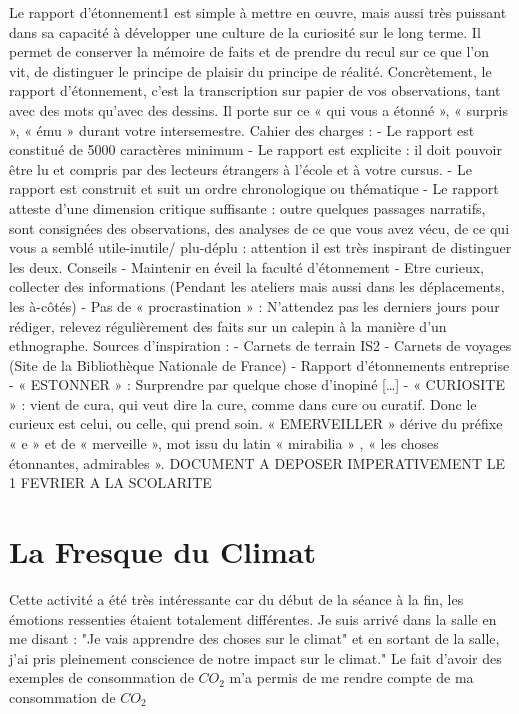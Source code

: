 Le rapport d’étonnement1 est simple à mettre en œuvre, mais aussi très puissant dans sa
capacité à développer une culture de la curiosité sur le long terme. Il permet de conserver la mémoire
de faits et de prendre du recul sur ce que l’on vit, de distinguer le principe de plaisir du principe de
réalité.
Concrètement, le rapport d’étonnement, c’est la transcription sur papier de vos observations,
tant avec des mots qu’avec des dessins. Il porte sur ce « qui vous a étonné », « surpris », « ému » durant
votre intersemestre.
Cahier des charges :
- Le rapport est constitué de 5000 caractères minimum
- Le rapport est explicite : il doit pouvoir être lu et compris par des lecteurs étrangers à l’école
et à votre cursus.
- Le rapport est construit et suit un ordre chronologique ou thématique
- Le rapport atteste d’une dimension critique suffisante : outre quelques passages narratifs,
sont consignées des observations, des analyses de ce que vous avez vécu, de ce qui vous a
semblé utile-inutile/ plu-déplu : attention il est très inspirant de distinguer les deux.
Conseils
- Maintenir en éveil la faculté d’étonnement
- Etre curieux, collecter des informations (Pendant les ateliers mais aussi dans les déplacements,
les à-côtés)
- Pas de « procrastination » : N’attendez pas les derniers jours pour rédiger, relevez régulièrement
des faits sur un calepin à la manière d’un ethnographe.
Sources d’inspiration :
- Carnets de terrain IS2
- Carnets de voyages (Site de la Bibliothèque Nationale de France)
- Rapport d’étonnements entreprise
- « ESTONNER » : Surprendre par quelque chose d’inopiné […]
- « CURIOSITE » : vient de cura, qui veut dire la cure, comme dans cure ou curatif. Donc le curieux
est celui, ou celle, qui prend soin. « EMERVEILLER » dérive du préfixe « e » et de « merveille »,
mot issu du latin « mirabilia » , « les choses étonnantes, admirables ».
DOCUMENT A DEPOSER IMPERATIVEMENT LE 1 FEVRIER A LA SCOLARITE
\newpage



\newcommand{\pd}{Petits Débrouillards }

\section{La Fresque du Climat}

Cette activité a été très intéressante car du début de la séance à la fin, les émotions ressenties étaient totalement différentes.
Je suis arrivé dans la salle en me disant : "Je vais apprendre des choses sur le climat" et en sortant de la salle, j'ai pris
pleinement conscience de notre impact sur le climat." Le fait d'avoir des exemples de consommation de $CO_2$ m'a permis de me rendre 
compte de ma consommation de $CO_2$


